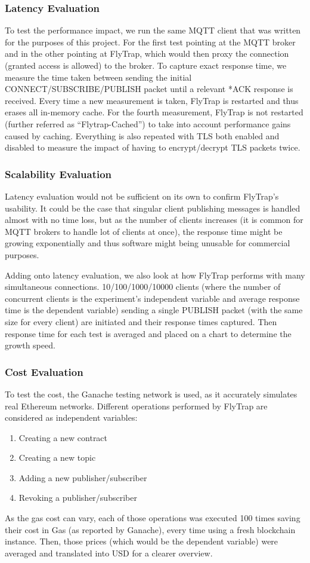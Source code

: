 \subsubsection{Latency Evaluation} To test the performance impact, we run the same MQTT client that was written for the purposes of this project. For the first test pointing at the MQTT broker and in the other pointing at FlyTrap, which would then proxy the connection (granted access is allowed) to the broker. To capture exact response time, we measure the time taken between sending the initial CONNECT/SUBSCRIBE/PUBLISH packet until a relevant *ACK response is received. Every time a new measurement is taken, FlyTrap is restarted and thus erases all in-memory cache. For the fourth measurement, FlyTrap is not restarted (further referred as ``Flytrap-Cached'') to take into account performance gains caused by caching. Everything is also repeated with TLS both enabled and disabled to measure the impact of having to encrypt/decrypt TLS packets twice.
\subsubsection{Scalability Evaluation}
Latency evaluation would not be sufficient on its own to confirm FlyTrap's usability. It could be the case that singular client publishing messages is handled almost with no time loss, but as the number of clients increases (it is common for MQTT brokers to handle lot of clients at once), the response time might be growing exponentially and thus software might being unusable for commercial purposes. 

Adding onto latency evaluation, we also look at how FlyTrap performs with many simultaneous connections. 10/100/1000/10000 clients (where the number of concurrent clients is the experiment's independent variable and average response time is the dependent variable) sending a single PUBLISH packet (with the same size for every client) are initiated and their response times captured. Then response time for each test is averaged and placed on a chart to determine the growth speed.  
\subsubsection{Cost Evaluation}
To test the cost, the Ganache testing network is used, as it accurately simulates real Ethereum networks. Different operations performed by FlyTrap are considered as independent variables:
\begin{enumerate}
  \item Creating a new contract
  \item Creating a new topic
  \item Adding a new publisher/subscriber
  \item Revoking a publisher/subscriber
\end{enumerate}
As the gas cost can vary, each of those operations was executed 100 times saving their cost in Gas (as reported by Ganache), every time using a fresh blockchain instance. Then, those prices (which would be the dependent variable) were averaged and translated into USD for a clearer overview.
